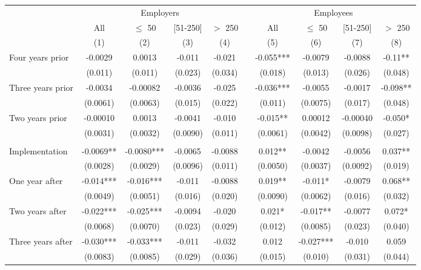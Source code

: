 \begin{tabular}{lccccccccc}
\toprule
      & \multicolumn{4}{c}{Employers } &       & \multicolumn{4}{c}{Employees} \\
\cmidrule{2-5}\cmidrule{7-10}      & All   & $\leq$ 50 & [51-250] & $>$ 250 &       & All   & $\leq$ 50 & [51-250] & $>$ 250 \\
\midrule
      & (1)   & (2)   & (3)   & (4)   &       & (5)   & (6)   & (7)   & (8) \\
\midrule
\midrule
Four years prior & -0.0029 & 0.0013 & -0.011 & -0.021 &       & -0.055*** & -0.0079 & -0.0088 & -0.11** \\
      & (0.011) & (0.011) & (0.023) & (0.034) &       & (0.018) & (0.013) & (0.026) & (0.048) \\
Three years prior & -0.0034 & -0.00082 & -0.0036 & -0.025 &       & -0.036*** & -0.0055 & -0.0017 & -0.098** \\
      & (0.0061) & (0.0063) & (0.015) & (0.022) &       & (0.011) & (0.0075) & (0.017) & (0.048) \\
Two years prior & -0.00010 & 0.0013 & -0.0041 & -0.010 &       & -0.015** & 0.00012 & -0.00040 & -0.050* \\
      & (0.0031) & (0.0032) & (0.0090) & (0.011) &       & (0.0061) & (0.0042) & (0.0098) & (0.027) \\
      &       &       &       &       &       &       &       &       &  \\
Implementation & -0.0069** & -0.0080*** & -0.0065 & -0.0088 &       & 0.012** & -0.0042 & -0.0056 & 0.037** \\
      & (0.0028) & (0.0029) & (0.0096) & (0.011) &       & (0.0050) & (0.0037) & (0.0092) & (0.019) \\
One year after & -0.014*** & -0.016*** & -0.011 & -0.0088 &       & 0.019** & -0.011* & -0.0079 & 0.068** \\
      & (0.0049) & (0.0051) & (0.016) & (0.020) &       & (0.0090) & (0.0062) & (0.016) & (0.032) \\
Two years after & -0.022*** & -0.025*** & -0.0094 & -0.020 &       & 0.021* & -0.017** & -0.0077 & 0.072* \\
      & (0.0068) & (0.0070) & (0.023) & (0.029) &       & (0.012) & (0.0085) & (0.023) & (0.040) \\
Three years after & -0.030*** & -0.033*** & -0.011 & -0.032 &       & 0.012 & -0.027*** & -0.010 & 0.059 \\
      & (0.0083) & (0.0085) & (0.029) & (0.036) &       & (0.015) & (0.010) & (0.031) & (0.044) \\

\end{tabular}
